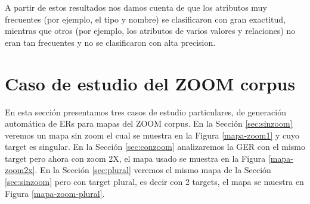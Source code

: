 
A partir de estos resultados nos damos cuenta de que los atributos muy frecuentes (por ejemplo, el tipo y nombre) se clasificaron con gran exactitud, mientras que otros (por ejemplo, los atributos de varios valores y relaciones) no eran tan frecuentes y no se clasificaron con alta precision.







\section{Caso de estudio del ZOOM corpus}
\label{sec:caso_estudio}

En esta secci\'on presentamos tres casos de estudio particulares, de generaci\'on autom\'atica de ERs para mapas del ZOOM corpus. En la Secci\'on \ref{sec:sinzoom} veremos un mapa sin zoom el cual se muestra en la Figura \ref{mapa-zoom1} y cuyo target es singular. En la Secci\'on \ref{sec:conzoom} analizaremos la GER con el mismo target pero ahora con zoom 2X, el mapa usado se muestra en la Figura \ref{mapa-zoom2x}. En la Secci\'on \ref{sec:plural} veremos el mismo mapa de la Secci\'on \ref{sec:sinzoom} pero con target plural, es decir con 2 targets, el mapa se muestra en Figura \ref{mapa-zoom-plural}.


%


